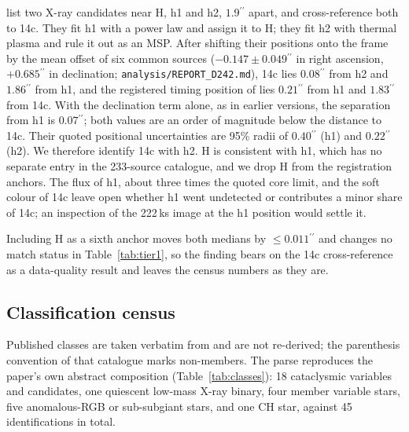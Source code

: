 \documentclass[11pt]{article}
\newcommand{\as}{\ensuremath{^{\prime\prime}}}
\begin{document}
\citet{ZhaoHeinke2023} list two X-ray candidates near H, h1 and h2, $1.9\as$ apart, and cross-reference both to 14c. They fit h1 with a power law and assign it to H; they fit h2 with thermal plasma and rule it out as an MSP. After shifting their positions onto the \citet{Henleywillis2018} frame by the mean offset of six common sources ($-0.147 \pm 0.049\as$ in right ascension, $+0.685\as$ in declination; \texttt{analysis/REPORT\_D242.md}), 14c lies $0.08\as$ from h2 and $1.86\as$ from h1, and the registered timing position of \citet{ColomiBernadich2026} lies $0.21\as$ from h1 and $1.83\as$ from 14c. With the declination term alone, as in earlier versions, the separation from h1 is $0.07\as$; both values are an order of magnitude below the distance to 14c. Their quoted positional uncertainties are 95\% radii of $0.40\as$ (h1) and $0.22\as$ (h2). We therefore identify 14c with h2. H is consistent with h1, which has no separate entry in the 233-source catalogue, and we drop H from the registration anchors. The flux of h1, about three times the quoted core limit, and the soft colour of 14c leave open whether h1 went undetected or contributes a minor share of 14c; an inspection of the 222\,ks image at the h1 position would settle it.

Including H as a sixth anchor moves both medians by $\leq0.011\as$ and changes no match status in Table~\ref{tab:tier1}, so the finding bears on the 14c cross-reference as a data-quality result and leaves the census numbers as they are.

\subsection{Classification census}
\label{sec:results-class}

Published classes are taken verbatim from \citet{Henleywillis2018} and are not re-derived; the parenthesis convention of that catalogue marks non-members. The parse reproduces the paper's own abstract composition (Table~\ref{tab:classes}): 18 cataclysmic variables and candidates, one quiescent low-mass X-ray binary, four member variable stars, five anomalous-RGB or sub-subgiant stars, and one CH star, against 45 identifications in total.
\end{document}
